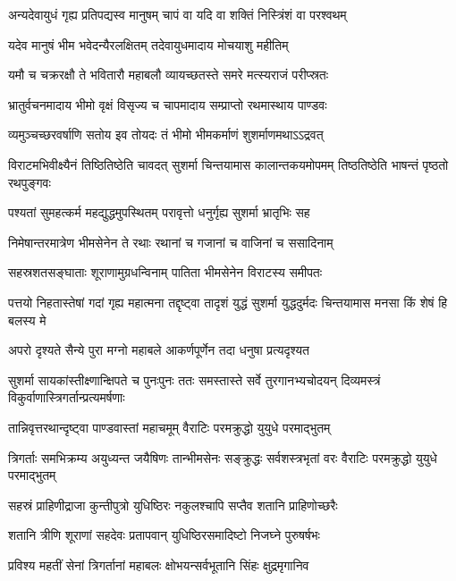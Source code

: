 \twolineshloka
{अन्यदेवायुधं गृह्य प्रतिपद्यस्व मानुषम्}
{चापं वा यदि वा शक्तिं निस्त्रिंशं वा परश्वथम्}


\twolineshloka
{यदेव मानुषं भीम भवेदन्यैरलक्षितम्}
{तदेवायुधमादाय मोचयाशु महीतिम्}


\twolineshloka
{यमौ च चक्ररक्षौ ते भवितारौ महाबलौ}
{व्यायच्छतस्ते समरे मत्स्यराजं परीप्स्रतः}



\twolineshloka
{भ्रातुर्वचनमादाय भीमो वृक्षं विसृज्य च}
{चापमादाय सम्प्राप्तो रथमास्थाय पाण्डवः}


\twolineshloka
{व्यमुञ्चच्छरवर्षाणि सतोय इव तोयदः}
{तं भीमो भीमकर्माणं शुशर्माणमथाऽऽद्रवत्}


\onelineshloka
{विराटमभिवीक्ष्यैनं तिष्ठितिष्ठेति चावदत्}
\twolineshloka
{सुशर्मा चिन्तयामास कालान्तकयमोपमम्}
{तिष्ठतिष्ठेति भाषन्तं पृष्ठतो रथपुङ्गवः}


\twolineshloka
{पश्यतां सुमहत्कर्म महद्युद्धमुपस्थितम्}
{परावृत्तो धनुर्गृह्य सुशर्मा भ्रातृभिः सह}


\twolineshloka
{निमेषान्तरमात्रेण भीमसेनेन ते रथाः}
{रथानां च गजानां च वाजिनां च ससादिनाम्}


\twolineshloka
{सहस्रशतसङ्घाताः शूराणामुग्रधन्विनाम्}
{पातिता भीमसेनेन विराटस्य समीपतः}


\onelineshloka
{पत्तयो निहतास्तेषां गदां गृह्य महात्मना}
\twolineshloka
{तद्दृष्ट्वा तादृशं युद्धं सुशर्मा युद्धदुर्मदः}
{चिन्तयामास मनसा किं शेषं हि बलस्य मे}


\twolineshloka
{अपरो दृश्यते सैन्ये पुरा मग्नो महाबले}
{आकर्णपूर्णेन तदा धनुषा प्रत्यदृश्यत}


\onelineshloka
{सुशर्मा सायकांस्तीक्ष्णान्क्षिपते च पुनःपुनः}
\twolineshloka
{ततः समस्तास्ते सर्वे तुरगानभ्यचोदयन्}
{दिव्यमस्त्रं विकुर्वाणास्त्रिगर्तान्प्रत्यमर्षणाः}


\twolineshloka
{तान्निवृत्तरथान्दृष्ट्वा पाण्डवास्तां महाचमूम्}
{वैराटिः परमक्रुद्धो युयुधे परमाद्भुतम्}


\threelineshloka
{त्रिगर्ताः समभिक्रम्य अयुध्यन्त जयैषिणः}
{तान्भीमसेनः सङ्क्रुद्धः सर्वशस्त्रभृतां वरः}
{वैराटिः परमक्रुद्धो युयुधे परमाद्भुतम्}


\twolineshloka
{सहस्रं प्राहिणीद्राजा कुन्तीपुत्रो युधिष्ठिरः}
{नकुलश्चापि सप्तैव शतानि प्राहिणोच्छरैः}


\twolineshloka
{शतानि त्रीणि शूराणां सहदेवः प्रतापवान्}
{युधिष्ठिरसमादिष्टो निजघ्ने पुरुषर्षभः}


\twolineshloka
{प्रविश्य महतीं सेनां त्रिगर्तानां महाबलः}
{क्षोभयन्सर्वभूतानि सिंहः क्षुद्रमृगानिव}


